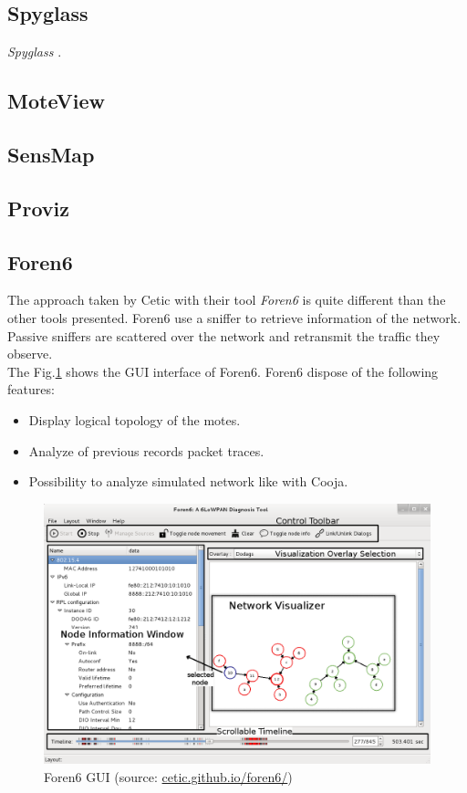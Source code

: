 \subsection{Spyglass}
\textit{Spyglass} \cite{buschmann2005spyglass}.

\subsection{MoteView}

\subsection{SensMap}

\subsection{Proviz}

\subsection{Foren6}

The approach taken by Cetic with their tool \textit{Foren6} \cite{website:foren6} is quite different than the other tools presented. Foren6 use a sniffer to retrieve information of the network. Passive sniffers are scattered over the network and retransmit the traffic they observe. \\

The Fig.\ref{fig:foren6} shows the GUI interface of Foren6. Foren6 dispose of the following features:
\begin{itemize}
  \item Display logical topology of the motes.
  \item Analyze of previous records packet traces.
  \item Possibility to analyze simulated network like with Cooja. \\
\end{itemize}

\begin{figure}
  \centering
  \includegraphics[width=\textwidth]{res/foren6.png}
  \caption{Foren6 GUI (source: \url{cetic.github.io/foren6/})}
  \label{fig:foren6}
\end{figure}

